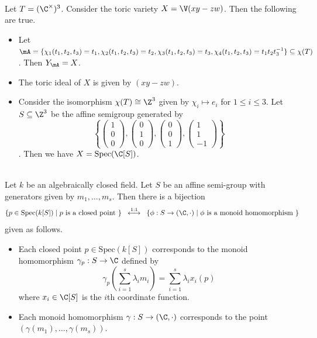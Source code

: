 \documentclass[a4paper]{article}
\begin{document}
\begin{eg}{}{}\\
Let $T=(\C^\times)^3$. Consider the toric variety $X=\V(xy-zw)$. Then the following are true. 
\begin{itemize}
\item Let $\mA=\{\chi_1(t_1,t_2,t_3)=t_1,\chi_2(t_1,t_2,t_3)=t_2,\chi_3(t_1,t_2,t_3)=t_3,\chi_4(t_1,t_2,t_3)=t_1t_2t_3^{-1}\}\subseteq\chi(T)$. Then $Y_\mA=X$. 
\item The toric ideal of $X$ is given by $(xy-zw)$. 
\item Consider the isomorphism $\chi(T)\cong\Z^3$ given by $\chi_i\mapsto e_i$ for $1\leq i\leq 3$. Let $S\subseteq\Z^3$ be the affine semigroup generated by $$\left\{\begin{pmatrix}1\\0\\0
\end{pmatrix},\begin{pmatrix}0\\1\\0
\end{pmatrix},\begin{pmatrix}0\\0\\1
\end{pmatrix},\begin{pmatrix}1\\1\\-1
\end{pmatrix}\right\}$$. Then we have $X=\text{Spec}(\C[S])$. 
\end{itemize}
\end{eg}

\begin{prp}{}{}\\
Let $k$ be an algebraically closed field. Let $S$ be an affine semi-group with generators given by $m_1,\dots,m_s$. Then there is a bijection $$\{p\in\text{Spec}(k[S])\;|\;p\text{ is a closed point }\}\;\;\overset{1:1}{\longleftrightarrow}\;\;\{\phi:S\to(\C,\cdot)\;|\;\phi\text{ is a monoid homomorphism }\}$$ given as follows. 
\begin{itemize}
\item Each closed point $p\in\text{Spec}(k[S])$ corresponds to the monoid homomorphism $\gamma_p:S\to\C$ defined by $$\gamma_p\left(\sum_{i=1}^s\lambda_im_i\right)=\sum_{i=1}^s\lambda_ix_i(p)$$ where $x_i\in\C[S]$ is the $i$th coordinate function. 
\item Each monoid homomorphism $\gamma:S\to(\C,\cdot)$ corresponds to the point $(\gamma(m_1),\dots,\gamma(m_s))$. 
\end{itemize}
\end{prp}
\end{document}
